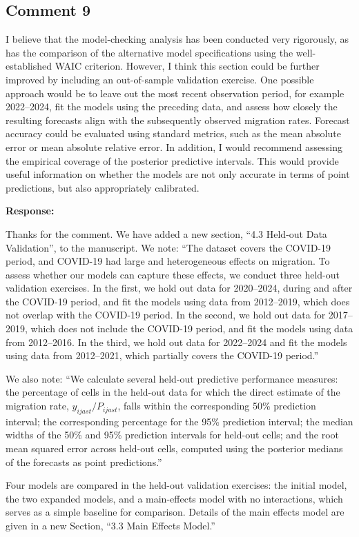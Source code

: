 \documentclass[11pt,a4paper]{article}
\newlength{\replyspace}
\newenvironment{response}{\par\addvspace{\replyspace}\nopagebreak\textbf{\textcolor{replyblue}{Response:}}\par\begingroup\color{replyblue}}{\par\endgroup\vspace{\replyspace}}
\newcommand{\refcomment}[2]{\par\Needspace{5\baselineskip}\subsection*{#1}#2\par}
\begin{document}
\refcomment{Comment 9}{
I believe that the model-checking analysis has been conducted very rigorously, as has the comparison of the alternative model specifications using the well-established WAIC criterion. However, I think this section could be further improved by including an out-of-sample validation exercise. One possible approach would be to leave out the most recent observation period, for example 2022--2024, fit the models using the preceding data, and assess how closely the resulting forecasts align with the subsequently observed migration rates. Forecast accuracy could be evaluated using standard metrics, such as the mean absolute error or mean absolute relative error. In addition, I would recommend assessing the empirical coverage of the posterior predictive intervals. This would provide useful information on whether the models are not only accurate in terms of point predictions, but also appropriately calibrated.
}
\begin{response}
Thanks for the comment. We have added a new section, ``4.3 Held-out Data Validation'', to the manuscript. We note: ``The dataset covers the COVID-19 period, and COVID-19 had large and heterogeneous effects on migration. To assess whether our models can capture these effects, we conduct three held-out validation exercises. In the first, we hold out data for 2020–2024, during and after the COVID-19 period, and fit the models using data from 2012–2019, which does not overlap with the COVID-19 period. In the second, we hold out data for 2017–2019, which does not include the COVID-19 period, and fit the models using data from 2012–2016. In the third, we hold out data for 2022–2024 and fit the models using data from 2012–2021, which partially covers the COVID-19 period.''

We also note: ``We calculate several held-out predictive performance measures: the percentage of cells in the held-out data for which the direct estimate of the migration rate, 
$y_{ijast}/P_{ijast}$, falls within the corresponding 50\% prediction interval; the corresponding percentage for the 95\% prediction interval; the median widths of the 50\% and 95\% prediction intervals for held-out cells; and the root mean squared error across held-out cells, computed using the posterior medians of the forecasts as point predictions.''

Four models are compared in the held-out validation exercises: the initial model, the two expanded models, and a main-effects model with no interactions, which serves as a simple baseline for comparison. Details of the main effects model are given in a new Section, ``3.3 Main Effects Model.''
\end{response}
\end{document}
